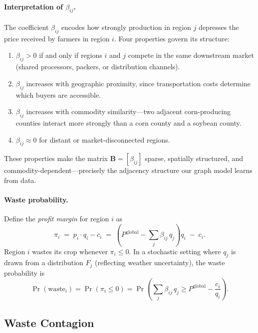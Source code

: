 \paragraph{Interpretation of $\beta_{ij}$.}
The coefficient $\beta_{ij}$ encodes how strongly production in region $j$ depresses the price received by farmers in region $i$.
Four properties govern its structure:
\begin{enumerate}[label=(\roman*)]
    \item $\beta_{ij} > 0$ if and only if regions $i$ and $j$ compete in the same downstream market (shared processors, packers, or distribution channels).
    \item $\beta_{ij}$ increases with geographic proximity, since transportation costs determine which buyers are accessible.
    \item $\beta_{ij}$ increases with commodity similarity---two adjacent corn-producing counties interact more strongly than a corn county and a soybean county.
    \item $\beta_{ij} \approx 0$ for distant or market-disconnected regions.
\end{enumerate}
These properties make the matrix $\mathbf{B} = [\beta_{ij}]$ sparse, spatially structured, and commodity-dependent---precisely the adjacency structure our graph model learns from data.

\paragraph{Waste probability.}
Define the \emph{profit margin} for region $i$ as
\begin{equation}
\label{eq:margin}
\pi_i \;=\; p_i \cdot q_i - c_i \;=\; \left(P^{\mathrm{global}} - \sum_{j} \beta_{ij}\, q_j \right) q_i \;-\; c_i.
\end{equation}
Region $i$ wastes its crop whenever $\pi_i \leq 0$.
In a stochastic setting where $q_j$ is drawn from a distribution $F_j$ (reflecting weather uncertainty), the waste probability is
\begin{equation}
\label{eq:waste_prob}
\Pr(\text{waste}_i) = \Pr\!\left(\pi_i \leq 0\right) = \Pr\!\left(\sum_{j} \beta_{ij}\, q_j \geq P^{\mathrm{global}} - \frac{c_i}{q_i}\right).
\end{equation}

\subsection{Waste Contagion}

